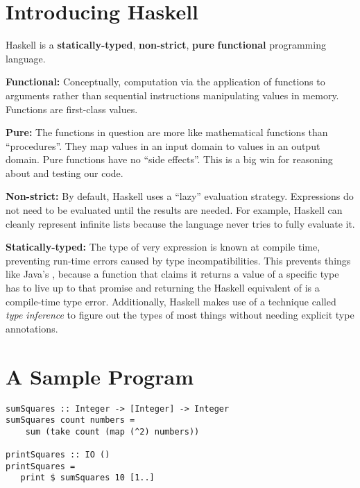 \section{Introducing Haskell}
\begin{notelist}
\item Haskell is a \textbf{statically-typed}, \textbf{non-strict}, \textbf{pure} \textbf{functional}
      programming language.
	\begin{notelist}
	\item \textbf{Functional:} Conceptually, computation via the application of functions to arguments rather than sequential instructions
          manipulating values in memory. Functions are first-class values.
	\item \textbf{Pure:} The functions in question are more like mathematical functions than ``procedures''. They map values in an input domain
          to values in an output domain. Pure functions have no ``side effects''. This is a big win for reasoning about and testing our code.
	\item \textbf{Non-strict:} By default, Haskell uses a ``lazy'' evaluation strategy. Expressions do not need to be evaluated until the 
          results are needed. For example, Haskell can cleanly represent infinite lists because the language never tries to fully evaluate it.
    \item \textbf{Statically-typed:} The type of very expression is known at compile time, preventing run-time errors caused by type
          incompatibilities. This prevents things like Java's , because a function that claims it returns
          a value of a specific type has to live up to that promise and returning the Haskell equivalent of  is a compile-time
          type error. Additionally, Haskell makes use of a technique called \textit{type inference} to figure out the types of most things
          without needing explicit type annotations.
	\end{notelist}
\end{notelist}
\pagebreak

\section{A Sample Program}

\begin{lstlisting}
sumSquares :: Integer -> [Integer] -> Integer
sumSquares count numbers =
    sum (take count (map (^2) numbers))

printSquares :: IO ()
printSquares =
   print $ sumSquares 10 [1..]
\end{lstlisting}

